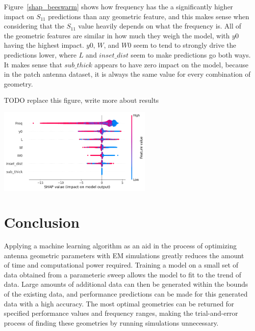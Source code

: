 \documentclass[conference]{IEEEtran}
\newenvironment{Figure}
    {\par\medskip\noindent\minipage{\linewidth}}
    {\endminipage\par\medskip}
\begin{document}
Figure~\ref{shap_beeswarm} shows how frequency has the a significantly higher impact on $S_{11}$ predictions than any geometric feature, and this makes sense when considering that the $S_{11}$ value heavily depends on what the frequency is. All of the geometric features are similar in how much they weigh the model, with $y0$ having the highest impact. $y0$, $W$, and $W0$ seem to tend to strongly drive the predictions lower, where $L$ and $inset\_dist$ seem to make predictions go both ways. It makes sense that $sub\_thick$ appears to have zero impact on the model, because in the patch antenna dataset, it is always the same value for every combination of geometry. 

TODO replace this figure, write more about results

\begin{Figure}
\centering
\includegraphics[width=3in]{shap_beeswarm}
\label{shap_beeswarm}
\end{Figure}
    

\section{Conclusion}
Applying a machine learning algorithm as an aid in the process of optimizing antenna geometric parameters with EM simulations greatly reduces the amount of time and computational power required. Training a model on a small set of data obtained from a parameteric sweep allows the model to fit to the trend of data. Large amounts of additional data can then be generated within the bounds of the existing data, and performance predictions can be made for this generated data with a high accuracy. The most optimal geometries can be returned for specified performance values and frequency ranges, making the trial-and-error process of finding these geometries by running simulations unnecessary. 




\vfill
\end{document}
